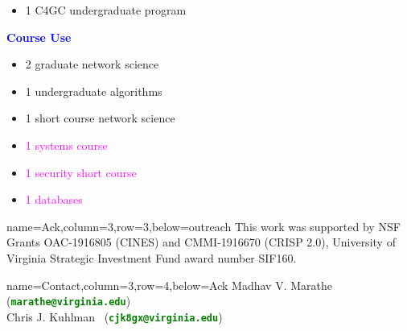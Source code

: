 \documentclass[landscape,paperwidth=70in,paperheight=46in,fontscale=0.225]{baposter} %
\begin{document}
\begin{poster}
{\begin{minipage}[t]{0.48 \textwidth}
\begin{itemize}[leftmargin=*,noitemsep,topsep=0pt]
    \item 1 C4GC undergraduate program
\end{itemize}
\end{minipage}
\quad
\begin{minipage}[t]{0.48 \textwidth}
\textcolor{blue}{\textbf{Course Use}}\
  \medskip
\begin{itemize}[leftmargin=*,noitemsep,topsep=0pt]
    \item 2 graduate network science    \smallskip
    \item 1 undergraduate algorithms   \smallskip
    \item 1 short course network science   \smallskip
    \item \textcolor{magenta}{1 systems course}  \smallskip
    \item \textcolor{magenta}{1 security short course}
    \item \textcolor{magenta}{1 databases}
\end{itemize}
\end{minipage}
}


          {name=Ack,column=3,row=3,below=outreach}{
{\footnotesize
This work was supported by
NSF Grants OAC-1916805 (CINES) and CMMI-1916670 (CRISP 2.0),
University of Virginia Strategic Investment Fund award
number SIF160.
}
}

          {name=Contact,column=3,row=4,below=Ack}{
{\footnotesize
{Madhav V. Marathe~ (\textcolor{green}{\textbf{\texttt{marathe@virginia.edu}}})}\\
{Chris J. Kuhlman~ (\textcolor{green}{\textbf{\texttt{cjk8gx@virginia.edu}}})}
}}

\end{poster}
\end{document}
